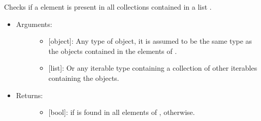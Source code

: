 \documentclass[letterpaper,10pt,english]{sphinxmanual}
\begin{document}

\begin{fulllineitems}
\label{\detokenize{iterables:data_tools.iterables.in_all}}
Checks if a element  is present in all collections contained in a
list .
\begin{itemize}
\item {} \begin{description}
\item[{Arguments:}] \leavevmode\begin{itemize}
\item {} 
 {[}object{]}: Any type of object, it is assumed to be the same
type as the objects contained in the elements of .

\item {} 
 {[}list{]}: Or any iterable type containing a collection of
other iterables containing the objects.

\end{itemize}

\end{description}

\item {} \begin{description}
\item[{Returns:}] \leavevmode\begin{itemize}
\item {} 
{[}bool{]}:  if  is found in all elements of ,
 otherwise.

\end{itemize}

\end{description}


\end{itemize}
\end{fulllineitems}
\end{document}
